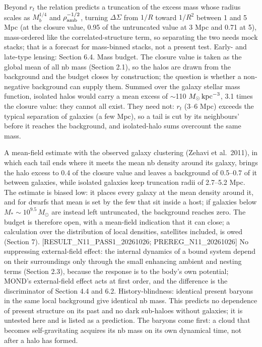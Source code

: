 \documentclass[
  10pt,
]{article}
\begin{document}
Beyond $r_t$ the relation predicts a truncation of the excess mass whose radius scales as $M_b^{1/4}$ and $\rho_{\rm amb}^{-1/2}$, turning $\Delta\Sigma$ from $1/R$ toward $1/R^2$ between 1 and 5 Mpc (at the closure value, 0.95 of the untruncated value at 3 Mpc and 0.71 at 5), mass-ordered like the correlated-structure term, so separating the two needs mock stacks; that is a forecast for mass-binned stacks, not a present test. Early- and late-type lensing: Section 6.4. Mass budget. The closure value is taken as the global mean of all nb mass (Section 2.1), so the halos are drawn from the background and the budget closes by construction; the question is whether a non-negative background can supply them. Summed over the galaxy stellar mass function, isolated halos would carry a mean excess of $\sim$110 $M_\odot\,{\rm kpc}^{-3}$, 3.1 times the closure value: they cannot all exist. They need not: $r_t$ (3--6 Mpc) exceeds the typical separation of galaxies (a few Mpc), so a tail is cut by its neighbours' before it reaches the background, and isolated-halo sums overcount the same mass.

A mean-field estimate with the observed galaxy clustering (Zehavi et al.~2011), in which each tail ends where it meets the mean nb density around its galaxy, brings the halo excess to 0.4 of the closure value and leaves a background of 0.5--0.7 of it between galaxies, while isolated galaxies keep truncation radii of 2.7--5.2 Mpc. The estimate is biased low: it places every galaxy at the mean density around it, and for dwarfs that mean is set by the few that sit inside a host; if galaxies below $M_*\sim10^{9.5}\,M_\odot$ are instead left untruncated, the background reaches zero. The budget is therefore open, with a mean-field indication that it can close; a calculation over the distribution of local densities, satellites included, is owed (Section 7). {[}RESULT\_N11\_PASS1\_20261026; PREREG\_N11\_20261026{]} No suppressing external-field effect: the internal dynamics of a bound system depend on their surroundings only through the small enhancing ambient and nesting terms (Section 2.3), because the response is to the body's own potential; MOND's external-field effect acts at first order, and the difference is the discriminator of Section 4.4 and 6.2. History-blindness: identical present baryons in the same local background give identical nb mass. This predicts no dependence of present structure on its past and no dark sub-haloes without galaxies; it is untested here and is listed as a prediction. The baryons come first: a cloud that becomes self-gravitating acquires its nb mass on its own dynamical time, not after a halo has formed.
\end{document}
